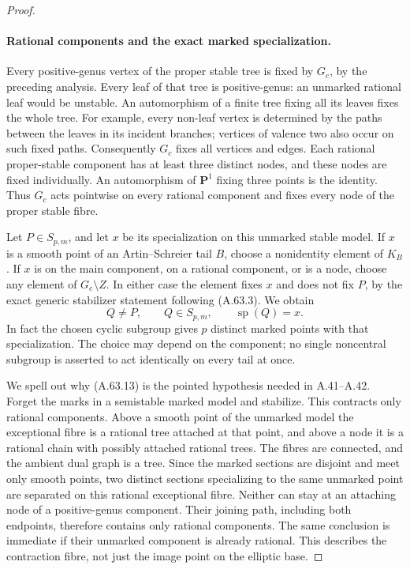 \begin{proof}
\paragraph{Rational components and the exact marked specialization.}
Every positive-genus vertex of the proper stable tree is
fixed by \(G_c\), by the preceding analysis. Every leaf
of that tree is positive-genus: an unmarked rational leaf
would be unstable. An automorphism of a finite tree fixing
all its leaves fixes the whole tree. For example, every
non-leaf vertex is determined by the paths between the
leaves in its incident branches; vertices of valence two
also occur on such fixed paths. Consequently \(G_c\)
fixes all vertices and edges. Each rational proper-stable
component has at least three distinct nodes, and these
nodes are fixed individually. An automorphism of
\(\mathbf P^1\) fixing three points is the identity.
Thus \(G_c\) acts pointwise on every rational component
and fixes every node of the proper stable fibre.

Let \(P\in S_{p,m}\), and let \(x\) be its specialization
on this unmarked stable model. If \(x\) is a smooth point
of an Artin--Schreier tail \(B\), choose a nonidentity
element of \(K_B\). If \(x\) is on the main component,
on a rational component, or is a node, choose any element
of \(G_c\setminus Z\). In either case the element fixes
\(x\) and does not fix \(P\), by the exact generic
stabilizer statement following (A.63.3). We obtain
\[
                    Q\ne P,\qquad Q\in S_{p,m},
                    \qquad \operatorname{sp}(Q)=x.
                                                        \tag{A.63.13}
\]
In fact the chosen cyclic subgroup gives \(p\) distinct
marked points with that specialization. The choice may
depend on the component; no single noncentral subgroup is
asserted to act identically on every tail at once.

We spell out why (A.63.13) is the pointed hypothesis
needed in A.41--A.42. Forget the marks in a semistable
marked model and stabilize. This contracts only rational
components. Above a smooth point of the unmarked model
the exceptional fibre is a rational tree attached at that
point, and above a node it is a rational chain with
possibly attached rational trees. The fibres are
connected, and the ambient dual graph is a tree. Since
the marked sections are disjoint and meet only smooth
points, two distinct sections specializing to the same
unmarked point are separated on this rational exceptional
fibre. Neither can stay at an attaching node of a
positive-genus component. Their joining path, including
both endpoints, therefore contains only rational
components. The same conclusion is immediate if their
unmarked component is already rational. This describes
the contraction fibre, not just the image point on the
elliptic base.


\end{proof}
